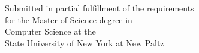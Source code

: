 \documentclass[notitlepage]{report}
\begin{document}

\vspace{1cm}

\begin{center}
	Submitted in partial fulfillment of the requirements \\
	for the Master of Science degree in \\
	Computer Science at the \\
	State University of New York at New Paltz \\
\end{center}


\newpage






\newpage

\tableofcontents

\newpage

\listoffigures
\listoftables

\newpage
{}
















\appendix

\printacronyms[include=abbrev,name=Abbreviations]

\newpage


%




\end{document}
